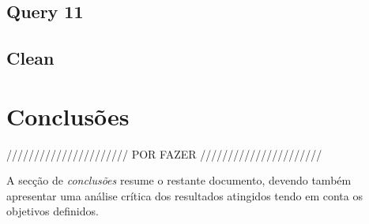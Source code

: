 \documentclass[a4paper]{article}
\begin{document}
\subsection{Query 11}

\subsection{Clean}

\section{Conclusões}
\label{sec:conclusao}

////////////////////// POR FAZER //////////////////////

A secção de \emph{conclusões} resume o restante documento, devendo
também apresentar uma análise crítica dos resultados atingidos tendo
em conta os objetivos definidos.
\end{document}
